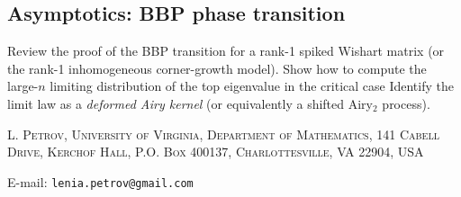 \documentclass[letterpaper,11pt,oneside,reqno]{article}
\numberwithin{equation}{section}
\theoremstyle{definition}
\begin{document}

\subsection{Asymptotics: BBP phase transition}
Review the proof of the BBP transition for a rank-1 spiked
Wishart matrix (or the rank-1 inhomogeneous corner-growth
model).  Show how to compute the large-\(n\) limiting
distribution of the top eigenvalue in the critical case
Identify the
limit law as a \emph{deformed Airy kernel} (or equivalently
a shifted Airy$_2$ process).








\medskip

\textsc{L. Petrov, University of Virginia, Department of Mathematics, 141 Cabell Drive, Kerchof Hall, P.O. Box 400137, Charlottesville, VA 22904, USA}

E-mail: \texttt{lenia.petrov@gmail.com}
\end{document}
